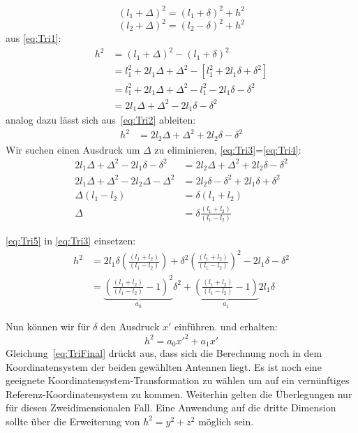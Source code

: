 \begin{appendix}
\begin{equation}\label{eq:Tri1}
(l_1+\Delta)^2 = (l_1+\delta)^2+h^2
\end{equation}
\begin{equation}\label{eq:Tri2}
(l_2+\Delta)^2 = (l_2-\delta)^2+h^2
\end{equation}
%
aus \eqref{eq:Tri1}:
\begin{align}
h^2 &= (l_1+\Delta)^2 - (l_1+\delta)^2\\
	&= l_1^2 + 2l_1\Delta + \Delta^2 -[ l_1^2 + 2 l_1 \delta + \delta^2]\nonumber\\
	&= l_1^2 + 2l_1\Delta + \Delta^2 - l_1^2 - 2 l_1 \delta - \delta^2	\nonumber\\
	&= 2l_1\Delta + \Delta^2 - 2 l_1 \delta - \delta^2 \label{eq:Tri3}
\end{align}
%
analog dazu lässt sich aus~\eqref{eq:Tri2} ableiten:
%
\begin{align}
h^2 &= 2l_2\Delta + \Delta^2 + 2 l_2 \delta - \delta^2 \label{eq:Tri4}
\end{align}
%
Wir suchen einen Ausdruck um $\Delta$ zu eliminieren, \eqref{eq:Tri3}=\eqref{eq:Tri4}:
%
\begin{align}
	2l_1\Delta + \Delta^2 - 2 l_1 \delta - \delta^2 &=  2l_2\Delta + \Delta^2 + 2 l_2 \delta - \delta^2 \nonumber \\
	2l_1\Delta + \Delta^2 - 2l_2\Delta - \Delta^2&= 2 l_2 \delta - \delta^2 +2l_1\delta +\delta^2 \nonumber \\
	\Delta(l_1 - l_2  ) &= \delta (l_1+l_2) \nonumber \\
	\Delta &= \delta\frac{(l_1 + l_2)}{(l_1 - l_2)} \label{eq:Tri5}
\end{align}

\eqref{eq:Tri5} in \eqref{eq:Tri3} einsetzen:
\begin{align}
	h^2 &= 2l_1\delta\left(\frac{(l_1 + l_2)}{(l_1 - l_2)}\right) + \delta^2\left(\frac{(l_1 + l_2)}{(l_1 - l_2)}\right)^2 - 2l_1 \delta - \delta^2 \nonumber \\
	&= \underbrace{\left(\frac{(l_1 + l_2)}{(l_1 - l_2)} - 1 \right)^2}_\text{$a_0$} \delta^2 + \underbrace{\left(\frac{(l_1 + l_2)}{(l_1 - l_2)}  - 1 \right)}_\text{$a_1$} 2l_1\delta
\end{align}

Nun können wir für $\delta$ den Ausdruck $x'$ einführen. und erhalten:
\begin{equation}
	h^2 = a_0 x'^2 + a_1 x' \label{eq:TriFinal}
\end{equation}
%
Gleichung~\eqref{eq:TriFinal} drückt aus, dass sich die Berechnung noch in dem Koordinatensystem der beiden gewählten Antennen liegt. Es ist noch eine geeignete Koordinatensystem-Transformation zu wählen um auf ein vernünftiges Referenz-Koordinatensystem zu kommen.
Weiterhin gelten die Überlegungen nur für diesen Zweidimensionalen Fall. Eine Anwendung auf die dritte Dimension sollte über die Erweiterung von $h^2 = y^2+z^2$ möglich sein.


\end{appendix}
